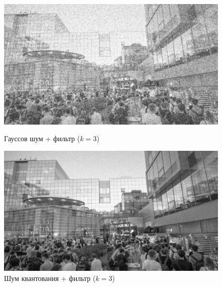 \documentclass[a4paper]{article}
\begin{document}
\begin{figure}[H]
    \begin{minipage}{0.49\textwidth}
        \centering \includegraphics[width=\textwidth]{images/3_nonlinear_filters/gaussian - wiener (k=3).jpg}
        \caption{Гауссов шум + фильтр ($k = 3$)}
    \end{minipage}\hfill
    \begin{minipage}{0.49\textwidth}
        \centering \includegraphics[width=\textwidth]{images/3_nonlinear_filters/poisson - wiener (k=3).jpg}
        \caption{Шум квантования + фильтр ($k = 3$)}
    \end{minipage}
\end{figure}
\end{document}
